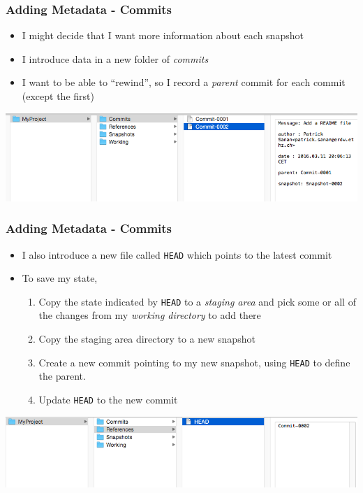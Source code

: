 \documentclass{beamer}
\begin{document}
\begin{frame}[fragile]
\frametitle{Adding Metadata - Commits}
\begin{itemize}
\item I might decide that I want more information about each snapshot
\item I introduce data in a new folder of \emph{commits} 
\item I want to be able to ``rewind'', so I record a \emph{parent} commit for each commit (except the first)
\end{itemize}
\includegraphics[scale=0.4]{commit1.png}\\
\end{frame}

\begin{frame}[fragile]
\frametitle{Adding Metadata - Commits}
\begin{itemize}
\item I also introduce a new file called \texttt{HEAD} which points to the latest commit
\item To save my state,
\begin{enumerate}
\item Copy the state indicated by \texttt{HEAD} to a \emph{staging area} and pick some or all of the changes from my \emph{working directory} to add there
\item Copy the staging area directory to a new snapshot
\item Create a new commit pointing to my new snapshot, using \texttt{HEAD} to define the parent.
\item Update \texttt{HEAD} to the new commit
\end{enumerate}
\end{itemize}
\includegraphics[scale=0.4]{commit2.png}
\end{frame}
\end{document}
